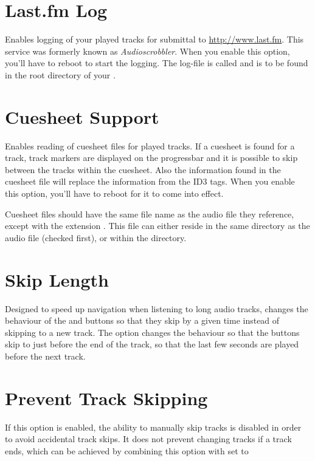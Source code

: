 \section{Last.fm Log}
  Enables logging of your played tracks for submittal to 
  \url{http://www.last.fm}. This service was formerly known as 
  \emph{Audioscrobbler}. When you enable this option, you'll have to reboot to
  start the logging. The log-file is called 
  and is to be found in the root directory of your \dap{}.\\


\section{Cuesheet Support}
  Enables reading of cuesheet files for played tracks. If a cuesheet is found
  for a track, track markers are displayed on the progressbar and it is
  possible to skip between the tracks within the cuesheet. Also the information
  found in the cuesheet file will replace the information from the ID3 tags.
  When you enable this option, you'll have to reboot for it to come into
  effect.

  Cuesheet files should have the same file name as the audio file they
  reference, except with the extension . This file can either reside in
  the same directory as the audio file (checked first), or within the
   directory.
  
\section{Skip Length}
  Designed to speed up navigation when listening to long audio tracks,
   changes the behaviour of
  the \ActionWpsSkipPrev{} and \ActionWpsSkipNext{} buttons so that they skip
  by a given time instead of skipping to a new track.
  The  option changes the behaviour so that the buttons
  skip to just before the end of the track, so that the last few seconds are
  played before the next track.

\section{Prevent Track Skipping}
  If this option is enabled, the ability to manually skip tracks is disabled
  in order to avoid accidental track skips. It does not prevent changing tracks
  if a track ends, which can be achieved by combining this option with
   set to 

